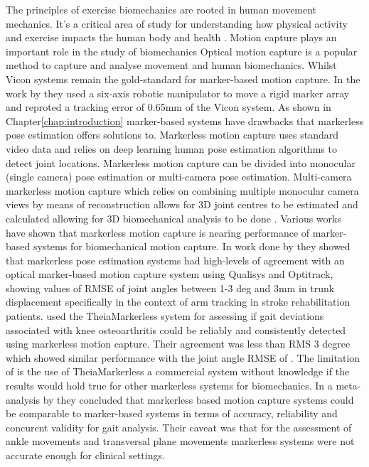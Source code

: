 The principles of exercise biomechanics are rooted in human movement mechanics. It's a critical area of study for understanding how physical activity and exercise impacts the human body and health \cite{forte2023biomechanics}.
Motion capture plays an important role in the study of biomechanics \cite{mundermann2006evolution}
Optical motion capture is a popular method to capture and analyse movement and human biomechanics. 
Whilst Vicon systems remain the gold-standard \cite{colyer2018review} for marker-based motion capture. In the work by \citet{chromy2025validated} they used a six-axis robotic manipulator to move a rigid marker array and reproted a tracking error of 0.65mm of the Vicon system. As shown in Chapter\ref{chap:introduction} marker-based systems have drawbacks that markerless pose estimation offers solutions to. Markerless motion capture uses standard video data and relies on deep learning human pose estimation algorithms to detect joint locations. Markerless motion capture can be divided into monocular (single camera) pose estimation  or multi-camera pose estimation. Multi-camera markerless motion capture which relies on combining multiple monocular camera views by means of reconstruction allows for 3D joint centres to be estimated and calculated allowing for 3D biomechanical analysis to be done \cite{wade2022applications}. 
Various works have shown that markerless motion capture is nearing performance of marker-based systems for biomechanical motion capture. 
In work done by \citet{unger2025differentiable} they showed that markerless pose estimation systems had high-levels of agreement with an optical marker-based motion capture system using Qualisys and Optitrack, showing values of RMSE of joint angles between 1-3 deg and 3mm in trunk displacement specifically in the context of arm tracking in stroke rehabilitation patients.
\citet{outerleys2025clinical} used the TheiaMarkerless system for assessing if gait deviations associated with knee osteoarthritis could be reliably and consistently detected using markerless motion capture. Their agreement was less than RMS 3 degree which showed similar performance with the joint angle RMSE of \citet{unger2025differentiable}. The limitation of \citet{outerleys2025clinical} is the use of TheiaMarkerless a commercial system without knowledge if the results would hold true for other markerless systems for biomechanics.
In a meta-analysis by \citet{scataglini2024accuracy} they concluded that markerless based motion capture systems could be comparable to marker-based systems in terms of accuracy, reliability and concurent validity for gait analysis. Their caveat was that for the assessment of ankle movements and transversal plane movements markerless systems were not accurate enough for clinical settings.
